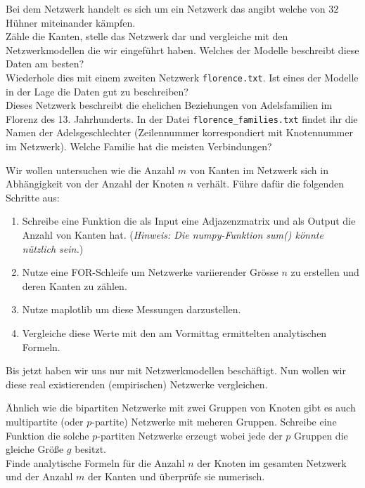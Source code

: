 Bei dem Netzwerk handelt es sich um ein Netzwerk das angibt welche von $32$ Hühner miteinander kämpfen.\\
Zähle die Kanten, stelle das Netzwerk dar und vergleiche mit den
Netzwerkmodellen die wir eingeführt haben. Welches der Modelle
beschreibt diese Daten am besten?\\
Wiederhole dies mit einem zweiten Netzwerk {\tt florence.txt}. Ist eines
der Modelle in der Lage die Daten gut zu beschreiben?\\
Dieses Netzwerk beschreibt die ehelichen Beziehungen von Adelsfamilien
im Florenz des 13. Jahrhunderts. In der Datei 
   {\tt florence\_families.txt} 
   findet ihr die Namen der Adelsgeschlechter (Zeilennummer
   korrespondiert mit Knotennummer im Netzwerk). Welche Familie hat die
   meisten Verbindungen?
{\tt

 \subexercise[%
  topic=Kanten zählen,
    ]

Wir wollen untersuchen wie die Anzahl $m$ von Kanten im Netzwerk sich in Abhängigkeit von der Anzahl der Knoten $n$ verhält. Führe dafür die folgenden Schritte aus:

\begin{enumerate}
\item Schreibe eine Funktion die als Input eine Adjazenzmatrix und als Output die Anzahl von Kanten hat. (\emph{Hinweis: Die numpy-Funktion sum() könnte nützlich sein.})
\item Nutze eine FOR-Schleife um Netzwerke variierender Grösse $n$ zu erstellen und deren Kanten zu zählen.
\item Nutze maplotlib um diese Messungen darzustellen. 
\item Vergleiche diese Werte mit den am Vormittag ermittelten analytischen Formeln.
\end{enumerate}


 \subexercise[%
  topic=Vergleich mit empirischen Netzwerken,
    ]

Bis jetzt haben wir uns nur mit Netzwerkmodellen beschäftigt. Nun wollen wir diese real existierenden (empirischen) Netzwerke vergleichen.


\exercise[%
  topic=Zusatzaufgaben
    ]

\subexercise[%
  topic=Multipartite Netzwerke,
    ]
		
    Ähnlich wie die bipartiten Netzwerke mit zwei Gruppen von Knoten
    gibt es auch multipartite (oder $p$-partite) Netzwerke mit meheren
    Gruppen. Schreibe eine Funktion die solche $p$-partiten Netzwerke
    erzeugt wobei jede der $p$ Gruppen die gleiche Grö\ss e $g$ besitzt.\\
    Finde analytische Formeln für die Anzahl $n$ der Knoten im gesamten
    Netzwerk und der Anzahl $m$ der Kanten und überprüfe sie numerisch.
		
}
